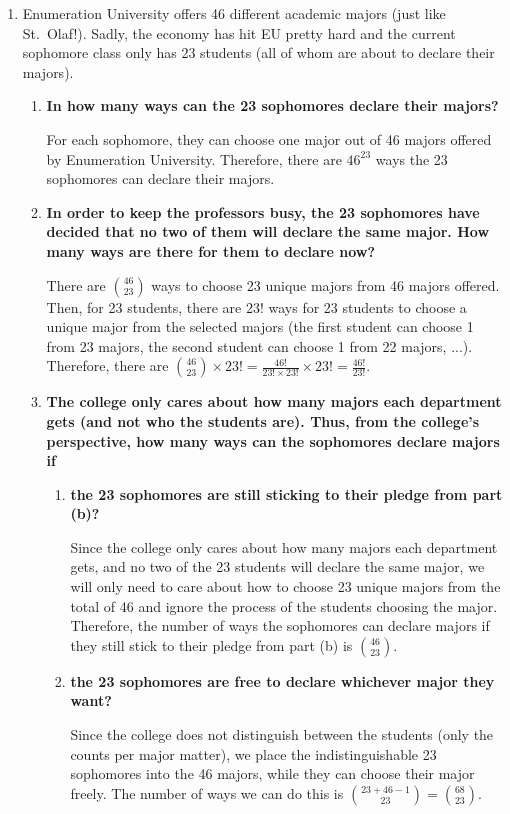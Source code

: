 \documentclass[10pt]{article}
\begin{document}
\begin{enumerate}
\begin{enumerate}
\end{enumerate}
\vskip 1cm

\item
Enumeration University offers 46 different academic majors (just like St.~Olaf!).  Sadly, the economy has hit EU pretty hard and the current sophomore class only has 23 students (all of whom are about to declare their majors).
\begin{enumerate}
\item
\textbf{In how many ways can the 23 sophomores declare their majors?}

For each sophomore, they can choose one major out of 46 majors offered by Enumeration University. Therefore, there are $46^{23}$ ways the 23 sophomores can declare their majors.
\item
\textbf{In order to keep the professors busy, the 23 sophomores have decided that no two of them will declare the same major. How many ways are there for them to declare now?}

There are $\binom{46}{23}$ ways to choose 23 unique majors from 46 majors offered. Then, for 23 students, there are $23!$ ways for 23 students to choose a unique major from the selected majors (the first student can choose 1 from 23 majors, the second student can choose 1 from 22 majors, ...). Therefore, there are $\binom{46}{23} \times 23! = \frac{46!}{23! \times 23!} \times 23! = \frac{46!}{23!}$. 
\item
\textbf{The college only cares about how many majors each department gets (and not who the students are).  Thus, from the college's perspective, how many ways can the sophomores declare majors if}
\begin{enumerate}
\item
\textbf{the 23 sophomores are still sticking to their pledge from part (b)?}

Since the college only cares about how many majors each department gets, and no two of the 23 students will declare the same major, we will only need to care about how to choose 23 unique majors from the total of 46 and ignore the process of the students choosing the major. Therefore, the number of ways the sophomores can declare majors if they still stick to their pledge from part (b) is $\binom{46}{23}$.
\item
\textbf{the 23 sophomores are free to declare whichever major they want?}

Since the college does not distinguish between the students (only the counts per major matter), we place the indistinguishable 23 sophomores into the 46 majors, while they can choose their major freely. The number of ways we can do this is $\binom{23 + 46 - 1}{23} = \binom{68}{23}$. 
\end{enumerate}



\end{enumerate}
\end{enumerate}
\end{document}

